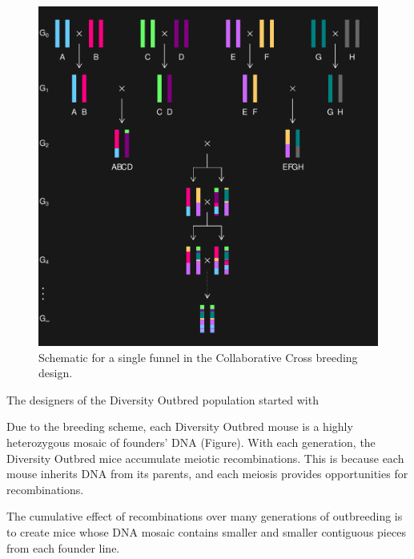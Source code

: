 \documentclass[]{article}\usepackage[]{graphicx}\usepackage[]{color}
\makeatletter
\def\maxwidth{ %
  \ifdim\Gin@nat@width>\linewidth
    \linewidth
  \else
    \Gin@nat@width
  \fi
}
\newenvironment{knitrout}{}{} %
\def\maxwidth{\ifdim\Gin@nat@width>\linewidth\linewidth\else\Gin@nat@width\fi}
\makeatother
\begin{document}
\begin{knitrout}
\color{fgcolor}\begin{figure}
\includegraphics[width=\maxwidth]{figure/ri8-1} \caption[Schematic for a single funnel in the Collaborative Cross breeding design]{Schematic for a single funnel in the Collaborative Cross breeding design.}\label{fig:ri8}
\end{figure}


\end{knitrout}




The designers of the Diversity Outbred population started with 

Due to the breeding scheme, each Diversity Outbred mouse is a highly heterozygous mosaic of 
founders' DNA (Figure). 
With each generation, the Diversity Outbred mice accumulate meiotic recombinations. 
This is because each mouse inherits DNA from its parents, and each meiosis provides opportunities for recombinations. 

The cumulative effect of recombinations over many generations of outbreeding is to create mice whose DNA mosaic contains smaller and smaller contiguous pieces from each founder line. 
\end{document}
